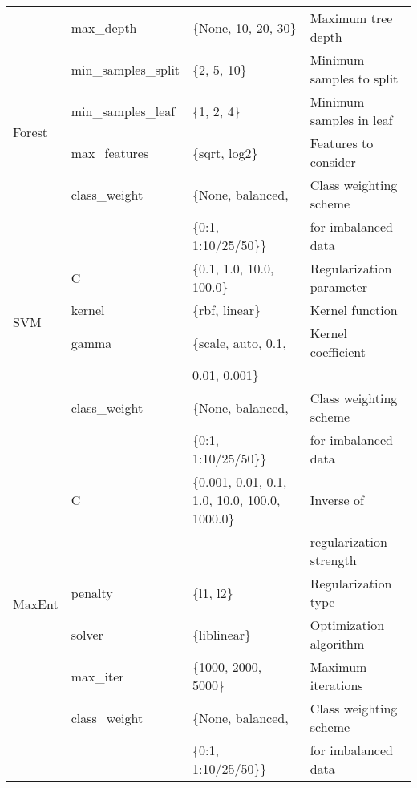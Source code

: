 \documentclass{article}
\begin{document}
\begin{table}[htbp]
\begin{tabular}{llll}
    \multirow{6}{*}{Forest} & max\_depth & \{None, 10, 20, 30\} & Maximum tree depth \\
    & min\_samples\_split & \{2, 5, 10\} & Minimum samples to split \\
    & min\_samples\_leaf & \{1, 2, 4\} & Minimum samples in leaf \\
    & max\_features & \{sqrt, log2\} & Features to consider \\
    & class\_weight & \{None, balanced, & Class weighting scheme \\
    & & \{0:1, 1:10/25/50\}\} & for imbalanced data \\
    \midrule
    \multirow{4}{*}{SVM} & C & \{0.1, 1.0, 10.0, 100.0\} & Regularization parameter \\
    & kernel & \{rbf, linear\} & Kernel function \\
    & gamma & \{scale, auto, 0.1, & Kernel coefficient \\
    & & 0.01, 0.001\} & \\
    & class\_weight & \{None, balanced, & Class weighting scheme \\
    & & \{0:1, 1:10/25/50\}\} & for imbalanced data \\
    \midrule
    \multirow{6}{*}{MaxEnt} & C & \{0.001, 0.01, 0.1, 1.0, 10.0, 100.0, 1000.0\} & Inverse of  \\
    & & & regularization strength \\
    & penalty & \{l1, l2\} & Regularization type \\
    & solver & \{liblinear\} & Optimization algorithm \\
    & max\_iter & \{1000, 2000, 5000\} & Maximum iterations \\

    & class\_weight & \{None, balanced, & Class weighting scheme \\
    & & \{0:1, 1:10/25/50\}\} & for imbalanced data \\
    \bottomrule
    \end{tabular}
    \label{tab:hyperparameters}
    \end{table}
\end{document}
